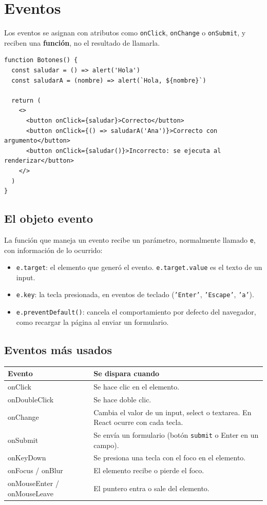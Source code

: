 \documentclass[11pt,a4paper]{article}
\newcommand{\cmd}[1]{\texttt{\color{reactdark}#1}}
\begin{document}
\section{Eventos}

Los eventos se asignan con atributos como \cmd{onClick}, \cmd{onChange} o \cmd{onSubmit}, y reciben una \textbf{función}, no el resultado de llamarla.

\begin{lstlisting}[language=JSX]
function Botones() {
  const saludar = () => alert('Hola')
  const saludarA = (nombre) => alert(`Hola, ${nombre}`)

  return (
    <>
      <button onClick={saludar}>Correcto</button>
      <button onClick={() => saludarA('Ana')}>Correcto con argumento</button>
      <button onClick={saludar()}>Incorrecto: se ejecuta al renderizar</button>
    </>
  )
}
\end{lstlisting}

\subsection{El objeto evento}

La función que maneja un evento recibe un parámetro, normalmente llamado \cmd{e}, con información de lo ocurrido:
\begin{itemize}
  \item \cmd{e.target}: el elemento que generó el evento. \cmd{e.target.value} es el texto de un input.
  \item \cmd{e.key}: la tecla presionada, en eventos de teclado (\cmd{'Enter'}, \cmd{'Escape'}, \cmd{'a'}).
  \item \cmd{e.preventDefault()}: cancela el comportamiento por defecto del navegador, como recargar la página al enviar un formulario.
\end{itemize}

\subsection{Eventos más usados}

\begin{center}
\small
\begin{tabular}{>{\ttfamily}l p{9.5cm}}
\toprule
\textrm{\textbf{Evento}} & \textbf{Se dispara cuando} \\
\midrule
onClick & Se hace clic en el elemento. \\
onDoubleClick & Se hace doble clic. \\
onChange & Cambia el valor de un input, select o textarea. En React ocurre con cada tecla. \\
onSubmit & Se envía un formulario (botón \cmd{submit} o Enter en un campo). \\
onKeyDown & Se presiona una tecla con el foco en el elemento. \\
onFocus / onBlur & El elemento recibe o pierde el foco. \\
onMouseEnter / onMouseLeave & El puntero entra o sale del elemento. \\
\bottomrule
\end{tabular}
\end{center}
\end{document}
